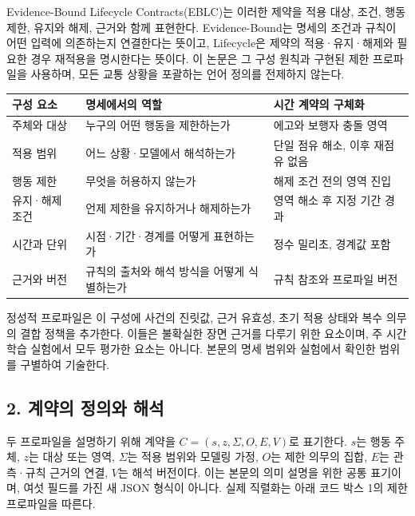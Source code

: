 \documentclass[11pt,a4paper]{article}
\begin{document}
Evidence-Bound Lifecycle Contracts(EBLC)는 이러한 제약을 적용 대상, 조건, 행동 제한, 유지와 해제, 근거와 함께 표현한다. Evidence-Bound는 명세의 조건과 규칙이 어떤 입력에 의존하는지 연결한다는 뜻이고, Lifecycle은 제약의 적용·유지·해제와 필요한 경우 재적용을 명시한다는 뜻이다. 이 논문은 그 구성 원칙과 구현된 제한 프로파일을 사용하며, 모든 교통 상황을 포괄하는 언어 정의를 전제하지 않는다.\par

\par\medskip\noindent\begin{minipage}{\linewidth}\small
\begin{tabular}{@{}>{\raggedright\arraybackslash}p{}>{\raggedright\arraybackslash}p{}>{\raggedright\arraybackslash}p{}@{}}
\toprule
\textbf{구성 요소} & \textbf{명세에서의 역할} & \textbf{시간 계약의 구체화} \\
\midrule
주체와 대상 & 누구의 어떤 행동을 제한하는가 & 에고와 보행자 충돌 영역 \\
적용 범위 & 어느 상황·모델에서 해석하는가 & 단일 점유 해소, 이후 재점유 없음 \\
행동 제한 & 무엇을 허용하지 않는가 & 해제 조건 전의 영역 진입 \\
유지·해제 조건 & 언제 제한을 유지하거나 해제하는가 & 영역 해소 후 지정 기간 경과 \\
시간과 단위 & 시점·기간·경계를 어떻게 표현하는가 & 정수 밀리초, 경계값 포함 \\
근거와 버전 & 규칙의 출처와 해석 방식을 어떻게 식별하는가 & 규칙 참조와 프로파일 버전 \\
\bottomrule\end{tabular}\end{minipage}\par\medskip

정성적 프로파일은 이 구성에 사건의 진릿값, 근거 유효성, 초기 적용 상태와 복수 의무의 결합 정책을 추가한다. 이들은 불확실한 장면 근거를 다루기 위한 요소이며, 주 시간 학습 실험에서 모두 평가한 요소는 아니다. 본문의 명세 범위와 실험에서 확인한 범위를 구별하여 기술한다.\par

\subsection*{2. 계약의 정의와 해석}

두 프로파일을 설명하기 위해 계약을 \(C = (s, z, \Sigma, O, E, V)\)로 표기한다. \(s\)는 행동 주체, \(z\)는 대상 또는 영역, \(\Sigma\)는 적용 범위와 모델링 가정, \(O\)는 제한 의무의 집합, \(E\)는 관측·규칙 근거의 연결, \(V\)는 해석 버전이다. 이는 본문의 의미 설명을 위한 공통 표기이며, 여섯 필드를 가진 새 JSON 형식이 아니다. 실제 직렬화는 아래 코드 박스 1의 제한 프로파일을 따른다.\par
\end{document}
